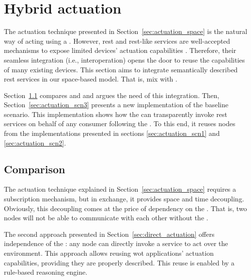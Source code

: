 \section{Hybrid actuation}
\label{sec:hybrid_actuation}

The actuation technique presented in Section~\ref{sec:actuation_space} is the natural way of acting using a \Space{}.
However, \ac{rest} and \ac{rest}-like services are well-accepted mechanisms to expose limited devices' actuation capabilities \citep{guinard_internet_2011}. %
Therefore, their seamless integration (i.e., interoperation) opens the door to reuse the capabilities of many existing devices.
This section aims to integrate semantically described \ac{rest} services in our space-based model. %
That is, mix \spaceActuation{} with \restActuation{}.

Section~\ref{sec:actuation_comparison} compares \spaceActuation{} and \restActuation{} and argues the need of this integration.
Then, Section~\ref{sec:actuation_scn3} presents a new implementation of the baseline scenario.
This implementation shows how the \Space{} can transparently invoke \ac{rest} services on behalf of any consumer following the \spaceActuation{}.
To this end, it reuses nodes from the implementations presented in sections \ref{sec:actuation_scn1} and \ref{sec:actuation_scn2}.


\subsection{Comparison}
\label{sec:actuation_comparison}

The actuation technique explained in Section~\ref{sec:actuation_space} requires a subscription mechanism, but in exchange, it provides space and time decoupling.
Obviously, this decoupling comes at the price of dependency on the \Space{}.
That is, two nodes will not be able to communicate with each other without the \Space{}.


The second approach presented in Section~\ref{sec:direct_actuation} offers independence of the \Space{}: any node can directly invoke a service to act over the environment.
This approach allows reusing \ac{wot} applications' actuation capabilities, providing they are properly described. %
This reuse is enabled by a rule-based reasoning engine. %


